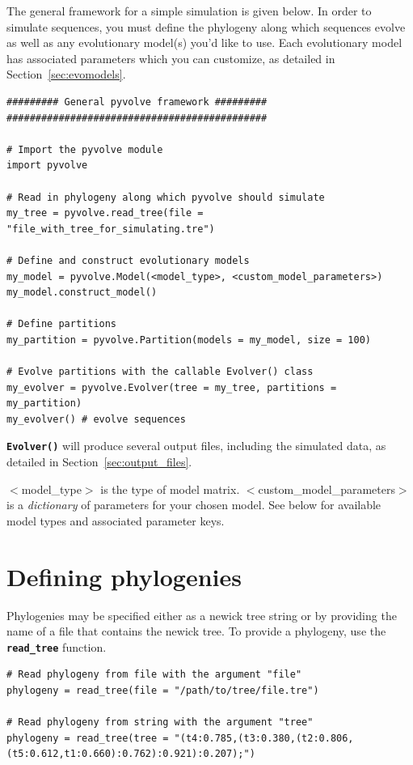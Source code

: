 \documentclass{article}
\newcommand{\code}[1]{\textbf{\texttt{\small{#1}}}}
\begin{document}
The general framework for a simple simulation is given below. In order to simulate sequences, you must define the phylogeny along which sequences evolve as well as any evolutionary model(s) you'd like to use. Each evolutionary model has associated parameters which you can customize, as detailed in Section~\ref{sec:evomodels}.

\begin{lstlisting}
######### General pyvolve framework #########
#############################################

# Import the pyvolve module
import pyvolve

# Read in phylogeny along which pyvolve should simulate
my_tree = pyvolve.read_tree(file = "file_with_tree_for_simulating.tre")

# Define and construct evolutionary models
my_model = pyvolve.Model(<model_type>, <custom_model_parameters>)
my_model.construct_model()

# Define partitions
my_partition = pyvolve.Partition(models = my_model, size = 100)

# Evolve partitions with the callable Evolver() class
my_evolver = pyvolve.Evolver(tree = my_tree, partitions = my_partition)
my_evolver() # evolve sequences
\end{lstlisting}

\code{Evolver()} will produce several output files, including the simulated data, as detailed in Section~\ref{sec:output_files}.

$<$model\_type$>$ is the type of model matrix. $<$custom\_model\_parameters$>$ is a \textit{dictionary} of parameters for your chosen model. See below for available model types and associated parameter keys.



\section{Defining phylogenies}\label{sec:phylogeny}

Phylogenies may be specified either as a newick tree string or by providing the name of a file that contains the newick tree. To provide a phylogeny, use the \code{read\_tree} function.
\begin{lstlisting}
# Read phylogeny from file with the argument "file"
phylogeny = read_tree(file = "/path/to/tree/file.tre")

# Read phylogeny from string with the argument "tree"
phylogeny = read_tree(tree = "(t4:0.785,(t3:0.380,(t2:0.806,(t5:0.612,t1:0.660):0.762):0.921):0.207);")
\end{lstlisting}
\end{document}
